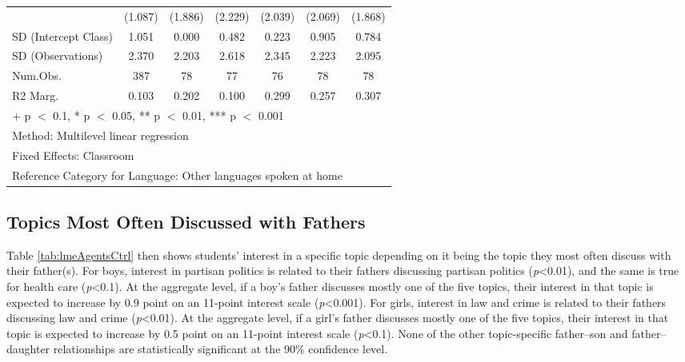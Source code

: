\documentclass[
  letterpaper,
  DIV=11,
  numbers=noendperiod]{scrreprt}
\begin{document}
\begin{table}
\begin{tabular}[t]{lcccccc}
\hspace{1em} & (1.087) & (1.886) & (2.229) & (2.039) & (2.069) & (1.868)\\
\hspace{1em}SD (Intercept Class) & 1.051 & 0.000 & 0.482 & 0.223 & 0.905 & 0.784\\
\hspace{1em}SD (Observations) & 2.370 & 2.203 & 2.618 & 2.345 & 2.223 & 2.095\\
\hspace{1em}Num.Obs. & 387 & 78 & 77 & 76 & 78 & 78\\
\hspace{1em}R2 Marg. & 0.103 & 0.202 & 0.100 & 0.299 & 0.257 & 0.307\\
\bottomrule
\multicolumn{7}{l}{\rule{0pt}{1em}+ p $<$ 0.1, * p $<$ 0.05, ** p $<$ 0.01, *** p $<$ 0.001}\\
\multicolumn{7}{l}{\rule{0pt}{1em}Method: Multilevel linear regression}\\
\multicolumn{7}{l}{\rule{0pt}{1em}Fixed Effects: Classroom}\\
\multicolumn{7}{l}{\rule{0pt}{1em}Reference Category for Language: Other languages spoken at home}\\
\end{tabular}
\end{table}

\hypertarget{topics-most-often-discussed-with-fathers}{%
\subsection{Topics Most Often Discussed with
Fathers}\label{topics-most-often-discussed-with-fathers}}

Table \ref{tab:lmeAgentsCtrl} then shows students' interest in a
specific topic depending on it being the topic they most often discuss
with their father(s). For boys, interest in partisan politics is related
to their fathers discussing partisan politics (\emph{p}\textless0.01),
and the same is true for health care (\emph{p}\textless0.1). At the
aggregate level, if a boy's father discusses mostly one of the five
topics, their interest in that topic is expected to increase by 0.9
point on an 11-point interest scale (\emph{p}\textless0.001). For girls,
interest in law and crime is related to their fathers discussing law and
crime (\emph{p}\textless0.01). At the aggregate level, if a girl's
father discusses mostly one of the five topics, their interest in that
topic is expected to increase by 0.5 point on an 11-point interest scale
(\emph{p}\textless0.1). None of the other topic-specific father--son and
father--daughter relationships are statistically significant at the 90\%
confidence level.
\end{document}
